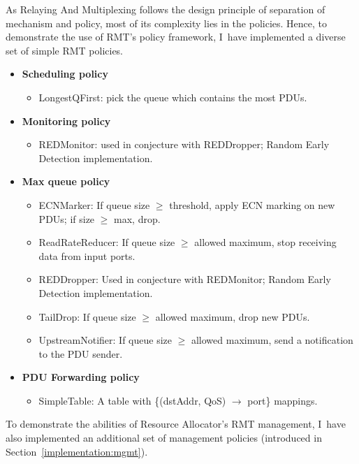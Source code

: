         As Relaying And Multiplexing follows the design principle of separation of mechanism and policy, most of its complexity lies in the policies. Hence, to demonstrate the use of RMT's policy framework, I~have implemented a diverse set of simple RMT policies.

        \begin{itemize}
            \item \textbf{Scheduling policy}
            \begin{itemize}
                \item LongestQFirst: pick the queue which contains the most PDUs.
            \end{itemize}
            \item \textbf{Monitoring policy}
            \begin{itemize}
                \item REDMonitor: used in conjecture with REDDropper; Random Early Detection implementation.
            \end{itemize}
            \item \textbf{Max queue policy}
            \begin{itemize}
                \item ECNMarker: If queue size $\geq$ threshold, apply ECN marking on new PDUs; if size $\geq$ max, drop.
                \item ReadRateReducer: If queue size $\geq$ allowed maximum, stop receiving data from input ports.
                \item REDDropper: Used in conjecture with REDMonitor; Random Early Detection implementation.
                \item TailDrop: If queue size $\geq$ allowed maximum, drop new PDUs.
                \item UpstreamNotifier: If queue size $\geq$ allowed maximum, send a notification to the PDU sender.
            \end{itemize}
            \item \textbf{PDU Forwarding policy}
            \begin{itemize}
                \item SimpleTable: A table with \{(dstAddr, QoS) $\rightarrow$ port\} mappings.
            \end{itemize}
        \end{itemize}

        To demonstrate the abilities of Resource Allocator's RMT management, I~have also implemented an additional set of management policies (introduced in Section~\ref{implementation:mgmt}).

